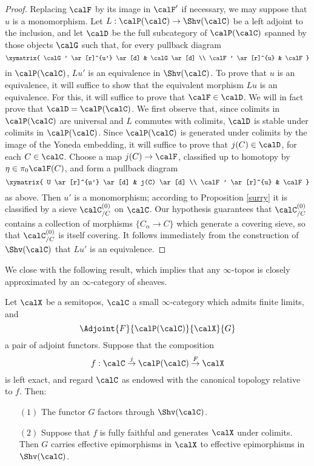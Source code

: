 \begin{proof}
Replacing $\calF$ by its image in $\calF'$ if necessary, we may suppose that
$u$ is a monomorphism. Let $L: \calP(\calC) \rightarrow \Shv(\calC)$ be a left adjoint to the inclusion, and let $\calD$ be the full subcategory of $\calP(\calC)$ spanned by those objects
$\calG$ such that, for every pullback diagram
$$ \xymatrix{ \calG' \ar[r]^{u'} \ar[d] & \calG \ar[d] \\
\calF' \ar[r]^{u} & \calF }$$
in $\calP(\calC)$, $Lu'$ is an equivalence in $\Shv(\calC)$. To prove that $u$ is an equivalence, it will suffice to show that the equivalent morphism $Lu$ is an equivalence. For this, it will suffice to prove that $\calF \in \calD$. We will in fact prove that $\calD = \calP(\calC)$. We first observe
that, since colimits in $\calP(\calC)$ are universal and $L$ commutes with colimits, 
$\calD$ is stable under colimits in $\calP(\calC)$. Since $\calP(\calC)$ is generated under colimits by the image of the Yoneda embedding, it will suffice to prove that $j(C) \in \calD$, for each $C \in \calC$. Choose a map $j(C) \rightarrow \calF$, classified up to homotopy by $\eta \in \pi_0 \calF(C)$, and form a pullback diagram 
$$ \xymatrix{ U \ar[r]^{u'} \ar[d] & j(C) \ar[d] \\
\calF' \ar[r]^{u} & \calF }$$
as above. Then $u'$ is a monomorphism; according to Proposition \ref{surry} it is classified
by a sieve $\calC^{(0)}_{/C}$ on $\calC$. Our hypothesis guarantees that $\calC^{(0)}_{/C}$ contains a collection of morphisms $\{ C_{\alpha} \rightarrow C \}$ which generate a covering sieve, so that $\calC^{(0)}_{/C}$ is itself covering. It follows immediately from the construction of $\Shv(\calC)$ that $Lu'$ is an equivalence.
\end{proof}

We close with the following result, which implies that any $\infty$-topos is closely approximated by an $\infty$-category of sheaves.

\begin{proposition}\label{preciselate}
Let $\calX$ be a semitopos, $\calC$ a small $\infty$-category which admits finite limits, and
$$ \Adjoint{F}{\calP(\calC)}{\calX}{G}$$ a pair of adjoint functors. Suppose that the composition
$$ f: \calC \stackrel{j}{\rightarrow} \calP(\calC) \stackrel{F}{\rightarrow} \calX$$
is left exact, and regard $\calC$ as endowed with the canonical topology relative to $f$.
Then:

\begin{itemize}
\item[$(1)$] The functor $G$ factors through $\Shv(\calC)$.

\item[$(2)$] Suppose that $f$ is fully faithful and generates $\calX$ under colimits. Then $G$ carries effective epimorphisms in $\calX$ to effective epimorphisms in $\Shv(\calC)$. 

\end{itemize}
\end{proposition}

